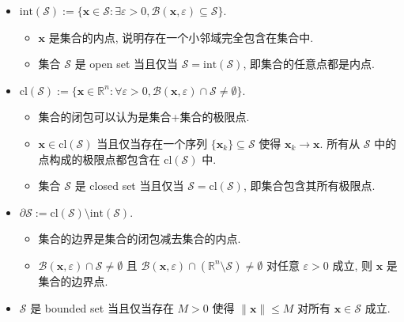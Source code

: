 \begin{itemize}
\item {}$\text{int}(\mathcal{S}) := \{\bm{x} \in \mathcal{S}: \exists \varepsilon > 0, \mathcal{B}(\bm{x}, \varepsilon) \subseteq \mathcal{S}\}$.

\begin{itemize}
\item {}$\bm{x}$ 是集合的内点, 说明存在一个小邻域完全包含在集合中.


\item {}集合 $\mathcal{S}$ 是 open set 当且仅当 $\mathcal{S} = \text{int}(\mathcal{S})$, 即集合的任意点都是内点.


\end{itemize}


\item {}$\text{cl}(\mathcal{S}) := \{\bm{x} \in \mathbb{R}^n: \forall \varepsilon > 0, \mathcal{B}(\bm{x}, \varepsilon) \cap \mathcal{S} \neq \emptyset\}$.

\begin{itemize}
\item {}集合的闭包可以认为是集合+集合的极限点.


\item {}$\bm{x} \in \text{cl}(\mathcal{S})$ 当且仅当存在一个序列 $\{\bm{x}_k\} \subseteq \mathcal{S}$ 使得 $\bm{x}_k \to \bm{x}$. 所有从 $\mathcal{S}$ 中的点构成的极限点都包含在 $\text{cl}(\mathcal{S})$ 中.


\item {}集合 $\mathcal{S}$ 是 closed set 当且仅当 $\mathcal{S} = \text{cl}(\mathcal{S})$, 即集合包含其所有极限点.


\end{itemize}


\item {}$\partial \mathcal{S} := \text{cl}(\mathcal{S}) \setminus \text{int}(\mathcal{S})$.

\begin{itemize}
\item {}集合的边界是集合的闭包减去集合的内点.


\item {}$\mathcal{B}(\bm{x}, \varepsilon) \cap \mathcal{S} \neq \emptyset$ 且 $\mathcal{B}(\bm{x}, \varepsilon) \cap (\mathbb{R}^n \setminus \mathcal{S}) \neq \emptyset$ 对任意 $\varepsilon > 0$ 成立, 则 $\bm{x}$ 是集合的边界点.


\end{itemize}


\item {}$\mathcal{S}$ 是 bounded set 当且仅当存在 $M > 0$ 使得 $\|\bm{x}\| \leq M$ 对所有 $\bm{x} \in \mathcal{S}$ 成立.



\end{itemize}
